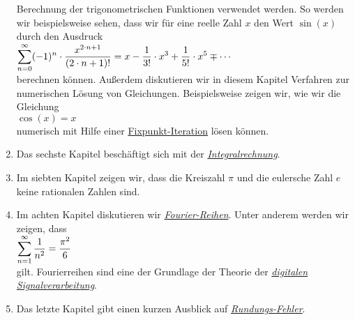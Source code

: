 \begin{enumerate}
      Berechnung der trigonometrischen Funktionen verwendet werden.  So werden wir beispielsweise
      sehen, dass wir f\"ur eine reelle Zahl $x$ den Wert $\sin(x)$ durch den Ausdruck
      \\[0.2cm]
      \hspace*{1.3cm}
      $\displaystyle \sum\limits_{n=0}^{\infty} (-1)^n \cdot \frac{x^{2 \cdot n + 1}}{(2 \cdot n + 1)!} = x - \frac{1}{3!} \cdot x^3 + \frac{1}{5!} \cdot x^5 \mp \cdots$
      \\[0.2cm]
      berechnen k\"onnen.  Au\ss{}erdem diskutieren wir in diesem Kapitel Verfahren zur numerischen L\"osung
      von Gleichungen.  Beispielsweise zeigen wir, wie wir die Gleichung
      \\[0.2cm]
      \hspace*{1.3cm}
      $\cos(x) = x$ 
      \\[0.2cm]
      numerisch mit Hilfe einer
      \href{https://de.wikipedia.org/wiki/Fixpunktiteration}{Fixpunkt-Iteration} l\"osen k\"onnen. 
\item Das sechste Kapitel besch\"aftigt sich mit der
      \href{http://de.wikipedia.org/wiki/Integralrechnung}{\emph{Integralrechnung}}. 
\item Im siebten Kapitel zeigen wir, dass die Kreiszahl  \href{http://de.wikipedia.org/wiki/Kreiszahl}{$\pi$} 
      und die eulersche Zahl \href{http://de.wikipedia.org/wiki/Eulersche_Zahl}{$e$} keine rationalen Zahlen sind.
\item Im achten Kapitel diskutieren wir \href{http://de.wikipedia.org/wiki/Fourierreihe}{\emph{Fourier-Reihen}}.
      Unter anderem werden wir zeigen, dass
      \\[0.2cm]
      \hspace*{1.3cm}
      $\displaystyle \sum\limits_{n=1}^{\infty} \frac{1}{n^2} = \frac{\pi^2}{6}$
      \\[0.2cm] 
      gilt.  Fourierreihen sind eine der Grundlage der Theorie der
      \href{http://de.wikipedia.org/wiki/Digitale_Signalverarbeitung}{\emph{digitalen Signalverarbeitung}}.
\item Das letzte Kapitel gibt einen kurzen Ausblick auf
      \href{http://de.wikipedia.org/wiki/Rundungsfehler}{\emph{Rundungs-Fehler}}. 
\end{enumerate}


